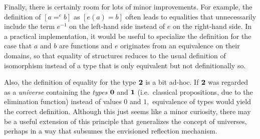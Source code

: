 \documentclass[a4paper]{article}
\theoremstyle{definition}
\theoremstyle{remark}
\newcommand{\pathOver}[1]{=^{#1}}
\newcommand{\0}{\primType{0}}
\newcommand{\1}{\primType{1}}
\newcommand{\2}{\primType{2}}
\begin{document}
Finally, there is certainly room for lots of minor improvements. For example, the definition of
$[a \pathOver{e} b]$ as $[e(a) = b]$ often leads to equalities that unnecessarily include the term
$e^{-1}$ on the left-hand side instead of $e$ on the right-hand side. In a practical implementation,
it would be useful to specialize the definition for the case that $a$ and $b$ are functions and $e$
originates from an equivalence on their domains, so that equality of structures reduces to the usual
definition of isomorphism instead of a type that is only equivalent but not definitionally so.

Also, the definition of equality for the type $\2$ is a bit ad-hoc. If $\2$ was regarded as a
\emph{universe} containing the \emph{types} $\0$ and $\1$ (i.e.\ classical propositions, due to the
elimination function) instead of values $0$ and $1,$ equivalence of types would yield the correct
definition. Although this just seems like a minor curiosity, there may be a useful extension of this
principle that generalizes the concept of universes, perhaps in a way that subsumes the envisioned
reflection mechanism.



\end{document}

